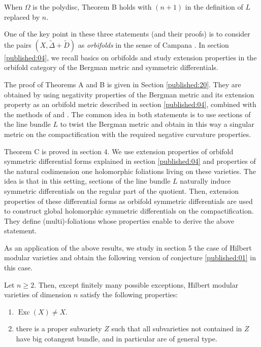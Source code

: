 \begin{thmc} When $\Omega$ is the polydisc, Theorem B holds with $(n+1)$ in the definition of $L$ replaced 
by $n$.
\end{thmc}

One of the key point in these three statements (and their proofs) is to consider the pairs $(X, \widetilde{\Delta}+\widetilde{D})$ as \emph{orbifolds} in the sense of Campana \cite{pubref07}. In section \ref{published:04}, we recall basics on orbifolds and study extension properties in the orbifold category of the Bergman metric and symmetric differentials.

The proof of Theorems A and B is given in Section \ref{published:20}. They are obtained by using negativity properties of the Bergman metric and its extension property as an orbifold metric described in section \ref{published:04}, combined with the methods of \cite{pubref06} and \cite{pubref16}. The common idea in both statements is to use sections of the line bundle $L$ to twist the Bergman metric and obtain in this way a singular metric on the compactification with the required negative curvature properties.

Theorem C is proved in section 4. We use extension properties of orbifold symmetric differential forms explained in section \ref{published:04} and properties of the natural codimension one holomorphic foliations living on these varieties. The idea is that in this setting, sections of the line bundle $L$ naturally induce symmetric differentials on the regular part of the quotient. Then, extension properties of these differential forms as orbifold symmetric differentials are used to construct global holomorphic symmetric differentials on the compactification. They define (multi)-foliations whose properties enable to derive the above statement.

As an application of the above results, we study in section 5 the case of Hilbert modular varieties and obtain the following version of conjecture \ref{published:01} in this case.

\begin{thmd}
Let $n \geqslant 2$. Then, except finitely many possible exceptions, Hilbert modular varieties of dimension $n$ satisfy the following properties:
\begin{enumerate}
\item $\operatorname{Exc}(X) \neq X$.
\item there is a proper subvariety $Z$ such that all subvarieties not contained in $Z$ have big cotangent bundle, and in particular are of general type.
\end{enumerate}
\end{thmd}


